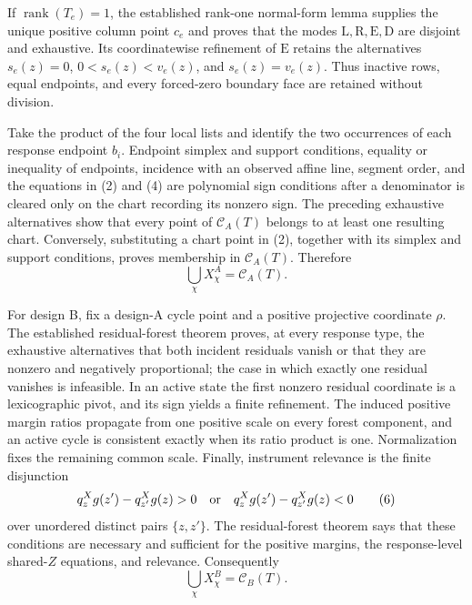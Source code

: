 If \(\operatorname{rank}(T_e)=1\), the established rank-one normal-form lemma supplies the unique positive column point \(c_e\) and proves that the modes \(\mathrm L,\mathrm R,\mathrm E,\mathrm D\) are disjoint and exhaustive.  Its coordinatewise refinement of \(\mathrm E\) retains the alternatives \(s_e(z)=0\), \(0<s_e(z)<v_e(z)\), and \(s_e(z)=v_e(z)\).  Thus inactive rows, equal endpoints, and every forced-zero boundary face are retained without division.

Take the product of the four local lists and identify the two occurrences of each response endpoint \(b_i\).  Endpoint simplex and support conditions, equality or inequality of endpoints, incidence with an observed affine line, segment order, and the equations in (2) and (4) are polynomial sign conditions after a denominator is cleared only on the chart recording its nonzero sign.  The preceding exhaustive alternatives show that every point of \(\mathcal C_A(T)\) belongs to at least one resulting chart.  Conversely, substituting a chart point in (2), together with its simplex and support conditions, proves membership in \(\mathcal C_A(T)\).  Therefore
\[
\bigcup_\chi X^A_\chi=\mathcal C_A(T).                      \tag{5}
\]

For design B, fix a design-A cycle point and a positive projective coordinate \(\rho\).  The established residual-forest theorem proves, at every response type, the exhaustive alternatives that both incident residuals vanish or that they are nonzero and negatively proportional; the case in which exactly one residual vanishes is infeasible.  In an active state the first nonzero residual coordinate is a lexicographic pivot, and its sign yields a finite refinement.  The induced positive margin ratios propagate from one positive scale on every forest component, and an active cycle is consistent exactly when its ratio product is one.  Normalization fixes the remaining common scale.  Finally, instrument relevance is the finite disjunction
\[
q^X_zg(z')-q^X_{z'}g(z)>0
\quad\hbox{or}\quad
q^X_zg(z')-q^X_{z'}g(z)<0                                  \tag{6}
\]
over unordered distinct pairs \(\{z,z'\}\).  The residual-forest theorem says that these conditions are necessary and sufficient for the positive margins, the response-level shared-\(Z\) equations, and relevance.  Consequently
\[
\bigcup_\chi X^B_\chi=\mathcal C_B(T).                      \tag{7}
\]


